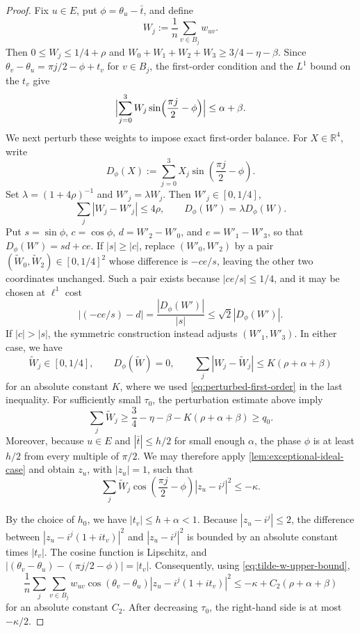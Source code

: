 \documentclass[reqno,11pt]{amsart}
\theoremstyle{definition}
\newcommand{\RR}{\mathbb{R}}
\newcommand{\abs}[1]{\left\lvert #1\right\rvert}
\newcommand{\paren}[1]{\left(#1\right)}
\begin{document}
\begin{proof}
Fix $u\in E$, put $\phi=\theta_u-\bar t$, and define
\[
    W_j:=\frac1n\sum_{v\in B_j}w_{uv}.
\]
Then $0\le W_j\le1/4+\rho$ and $W_0 + W_1 + W_2 + W_3 \geq 3/4 - \eta - \beta$. Since $\theta_v-\theta_u=\pi j/2-\phi+t_v$ for $v\in B_j$, the
first-order condition and the $L^1$ bound on the $t_v$ give
\begin{equation}\label{eq:perturbed-first-order}
\Bigl|{\sum_{j=0}^3W_j\sin\Bigl({\frac{\pi j}{2}-\phi}\Bigr)}\Bigr|
\le\alpha+\beta.
\end{equation}
We next perturb these weights to impose exact first-order balance.  For
$X\in\RR^4$, write
\[
    D_\phi(X):=\sum_{j=0}^3X_j
        \sin\paren{\frac{\pi j}{2}-\phi}.
\]
Set $\lambda=(1+4\rho)^{-1}$ and $W'_j=\lambda W_j$.  Then
$W'_j\in[0,1/4]$,
\[
    \sum_j\abs{W_j-W'_j}\le4\rho,
    \qquad
    D_\phi(W')=\lambda D_\phi(W).
\]
Put $s=\sin\phi$, $c=\cos\phi$, $d=W'_2-W'_0$, and
$e=W'_1-W'_3$, so that $D_\phi(W')=sd+ce$.  If
$\abs s\ge\abs c$, replace $(W'_0,W'_2)$ by a pair
$(\tilde W_0,\tilde W_2)\in[0,1/4]^2$ whose difference is
$-ce/s$, leaving the other two coordinates unchanged.  Such a pair exists
because $\abs{ce/s}\le1/4$, and it may be chosen at $\ell^1$ cost
\[
    \abs{(-ce/s)-d}
    =\frac{\abs{D_\phi(W')}}{\abs s}
    \le\sqrt2|{D_\phi(W')}|.
\]
If $\abs c>\abs s$, the symmetric construction instead adjusts
$(W'_1,W'_3)$.  In either case, we have
\[
    \tilde W_j\in[0,1/4],
    \qquad
    D_\phi(\tilde W)=0,
    \qquad
    \sum_j|{W_j-\tilde W_j}|
    \le K(\rho+\alpha+\beta)
\]
for an absolute constant $K$, where we used
\eqref{eq:perturbed-first-order} in the last inequality. For sufficiently small $\tau_0$, the perturbation estimate above imply
\[
    \sum_j\tilde W_j
    \ge\frac34-\eta-\beta-K(\rho+\alpha+\beta)\ge q_0.
\]
Moreover, because $u\in E$ and
$\abs{\bar t}\le h/2$ for small enough $\alpha$, the phase $\phi$ is at least $h/2$ from every
multiple of $\pi/2$.  We may therefore apply
\cref{lem:exceptional-ideal-case} and obtain $z_u$, with
$\abs{z_u}=1$, such that
\begin{equation}\label{eq:tilde-w-upper-bound}
\sum_j\tilde W_j\cos\paren{\frac{\pi j}{2}-\phi}
\abs{z_u-i^j}^2\le-\kappa.
\end{equation}

By the choice of $h_0$, we have $|{t_v}|\le h+\alpha<1$.  Because
$|{z_u-i^j}|\le2$, the difference between
$|{z_u-i^j(1+it_v)}|^2$ and $|{z_u-i^j}|^2$ is bounded by an absolute
constant times $\abs{t_v}$.
The cosine function is Lipschitz, and $|{(\theta_v-\theta_u)-(\pi j/2-\phi)}|=|{t_v}|.$ Consequently, using \eqref{eq:tilde-w-upper-bound},
\begin{equation*}
\frac1n\sum_j\sum_{v\in B_j}
w_{uv}\cos(\theta_v-\theta_u)
\abs{z_u-i^j(1+it_v)}^2\le-\kappa+C_2(\rho+\alpha+\beta)
\end{equation*}
for an absolute constant $C_2$.
After decreasing $\tau_0$, the right-hand side is at most
$-\kappa/2$.
\end{proof}
\end{document}
